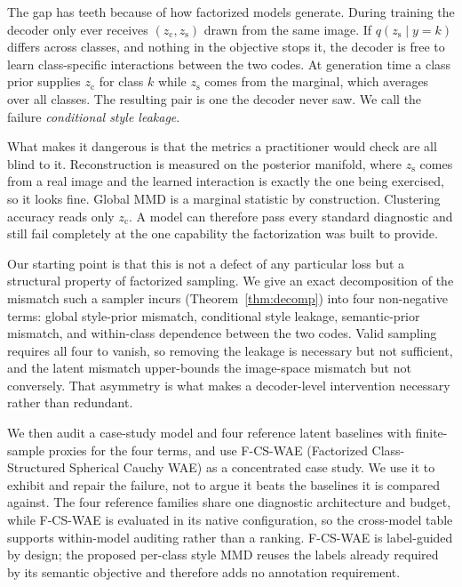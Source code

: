 \documentclass[letterpaper]{article}
\newcommand{\ours}{F-CS-WAE}
\newcommand{\zc}{z_{\mathrm{c}}}
\newcommand{\zs}{z_{\mathrm{s}}}
\begin{document}
The gap has teeth because of how factorized models generate. During
training the decoder only ever receives $(\zc,\zs)$ drawn from the same
image. If $q(\zs\mid y{=}k)$ differs across classes, and nothing in the
objective stops it, the decoder is free to learn class-specific interactions
between the two codes. At generation time a class prior supplies $\zc$ for
class $k$ while $\zs$ comes from the marginal, which averages over all
classes. The resulting pair is one the decoder never saw. We call the
failure \emph{conditional style leakage}.

What makes it dangerous is that the metrics a practitioner would check are
all blind to it. Reconstruction is measured on the posterior manifold, where
$\zs$ comes from a real image and the learned interaction is exactly the one
being exercised, so it looks fine. Global MMD is a marginal statistic by
construction. Clustering accuracy reads only $\zc$. A model can therefore
pass every standard diagnostic and still fail completely at the one
capability the factorization was built to provide.

Our starting point is that this is not a defect of any particular loss but a
structural property of factorized sampling. We give an exact decomposition
of the mismatch such a sampler incurs (Theorem~\ref{thm:decomp}) into four
non-negative terms: global style-prior mismatch, conditional style leakage,
semantic-prior mismatch, and within-class dependence between the two codes.
Valid sampling requires all four to vanish, so removing the leakage is
necessary but not sufficient, and the latent mismatch upper-bounds the
image-space mismatch but not conversely. That asymmetry is what makes a
decoder-level intervention necessary rather than redundant.

We then audit a case-study model and four reference latent baselines with
finite-sample proxies for the four terms, and use \ours{} (Factorized
Class-Structured Spherical Cauchy WAE) as
a concentrated case study. We use it to exhibit and repair the failure, not
to argue it beats the baselines it is compared against. The four reference
families share one diagnostic architecture and budget, while \ours{} is
evaluated in its native configuration, so the cross-model table supports
within-model auditing rather than a ranking. \ours{} is label-guided by
design; the proposed per-class style MMD reuses the labels already required
by its semantic objective and therefore adds no annotation requirement.
\end{document}
